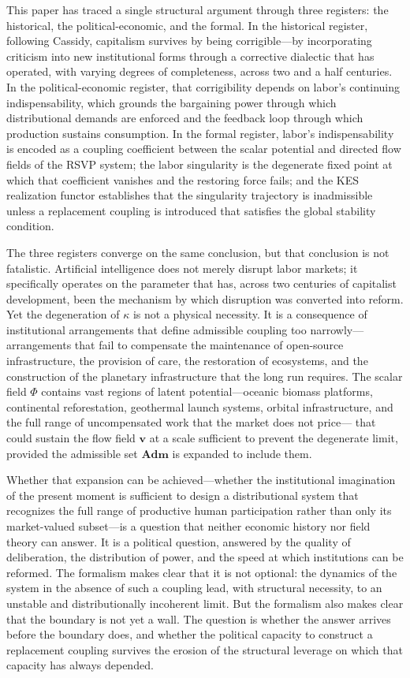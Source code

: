 \documentclass[11pt, a4paper]{article}
\theoremstyle{plain}
\theoremstyle{definition}
\newcommand{\Phifield}{\Phi}
\newcommand{\vfield}{\mathbf{v}}
\newcommand{\Adm}{\mathbf{Adm}}
\newcommand{\coupling}{\kappa}
\begin{document}
This paper has traced a single structural argument through three registers:
the historical, the political-economic, and the formal. In the historical
register, following Cassidy, capitalism survives by being corrigible---by
incorporating criticism into new institutional forms through a corrective
dialectic that has operated, with varying degrees of completeness, across
two and a half centuries. In the political-economic register, that
corrigibility depends on labor's continuing indispensability, which grounds
the bargaining power through which distributional demands are enforced and the
feedback loop through which production sustains consumption. In the formal
register, labor's indispensability is encoded as a coupling coefficient
between the scalar potential and directed flow fields of the RSVP system;
the labor singularity is the degenerate fixed point at which that coefficient
vanishes and the restoring force fails; and the KES realization functor
establishes that the singularity trajectory is inadmissible unless a
replacement coupling is introduced that satisfies the global stability
condition.

The three registers converge on the same conclusion, but that conclusion
is not fatalistic. Artificial intelligence does not merely disrupt labor
markets; it specifically operates on the parameter that has, across two
centuries of capitalist development, been the mechanism by which disruption
was converted into reform. Yet the degeneration of $\coupling$ is not a
physical necessity. It is a consequence of institutional arrangements that
define admissible coupling too narrowly---arrangements that fail to
compensate the maintenance of open-source infrastructure, the provision of
care, the restoration of ecosystems, and the construction of the planetary
infrastructure that the long run requires. The scalar field $\Phifield$
contains vast regions of latent potential---oceanic biomass platforms,
continental reforestation, geothermal launch systems, orbital infrastructure,
and the full range of uncompensated work that the market does not price---
that could sustain the flow field $\vfield$ at a scale sufficient to
prevent the degenerate limit, provided the admissible set $\Adm$ is expanded
to include them.

Whether that expansion can be achieved---whether the institutional imagination
of the present moment is sufficient to design a distributional system that
recognizes the full range of productive human participation rather than only
its market-valued subset---is a question that neither economic history nor
field theory can answer. It is a political question, answered by the quality
of deliberation, the distribution of power, and the speed at which institutions
can be reformed. The formalism makes clear that it is not optional: the dynamics
of the system in the absence of such a coupling lead, with structural necessity,
to an unstable and distributionally incoherent limit. But the formalism also
makes clear that the boundary is not yet a wall. The question is whether the
answer arrives before the boundary does, and whether the political capacity
to construct a replacement coupling survives the erosion of the structural
leverage on which that capacity has always depended.
\end{document}
